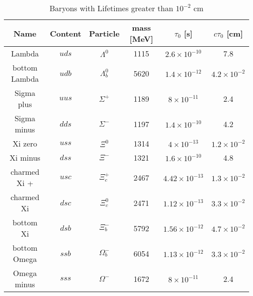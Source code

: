 \begin{table}
\begin{center}
\begin{tabular}{cccccc}
\textbf{Name}          & \textbf{Content} & \textbf{Particle}      & \textbf{mass} [MeV] &  $\tau_{0}$ [s] & $c\tau_{0}$ [cm] \\
\hline 
Lambda        & $uds$   & $\Lambda^0$   & 1115       & $2.6 \times 10^{-10}$    & 7.8                  \\
bottom Lambda & $udb$   & $\Lambda^0_b$ & 5620       & $1.4 \times 10^{-12}$    & $4.2 \times 10^{-2}$ \\
\hline
Sigma plus    & $uus$   & $\Sigma^{+}$  & 1189       & $8 \times 10^{-11}$      & 2.4                  \\
Sigma minus   & $dds$   & $\Sigma^{-}$  & 1197       & $1.4\times 10^{-10}$     & 4.2                  \\
\hline 
Xi zero       & $uss$   & $\Xi^0$       & 1314       & $4 \times 10^{-13}$      & $1.2 \times 10^{-2}$ \\
Xi minus      & $dss$   & $\Xi^-$       & 1321       & $1.6 \times 10^{-10}$    & 4.8                  \\
charmed Xi +  & $usc$   & $\Xi^{+}_c$   & 2467       & $4.42 \times 10^{-13}$   & $1.3 \times 10^{-2}$ \\
charmed Xi    & $dsc$   & $\Xi^0_c$     & 2471       & $1.12 \times 10^{-13}$   & $3.3 \times 10^{-2}$ \\
bottom Xi     & $dsb$   & $\Xi^-_b$     & 5792       & $1.56 \times 10^{-12}$   & $4.7 \times 10^{-2}$ \\
\hline
bottom Omega  & $ssb$   & $\Omega_b^-$  & 6054       & $1.13 \times 10^{-12}$   & $3.3 \times 10^{-2}$ \\
Omega minus   & $sss$   & $\Omega^-$    & 1672       & $8 \times 10^{-11}$      & 2.4                  \\
\end{tabular}
\end{center}
\caption{Baryons with Lifetimes greater than $10^{-2}$ cm} 
\label{tab:baryons}
\end{table}
